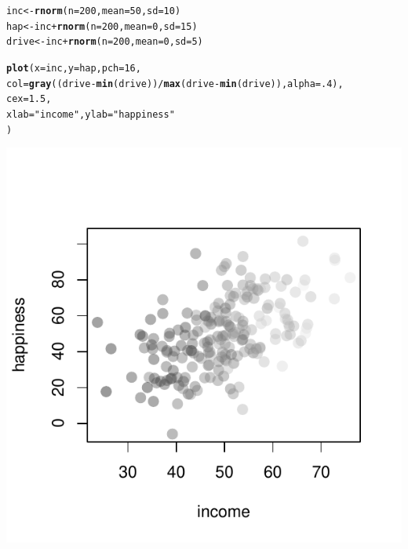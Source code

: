 \documentclass{tufte-book}\usepackage[]{graphicx}\usepackage[]{color}
\makeatletter
\def\maxwidth{ %
  \ifdim\Gin@nat@width>\linewidth
    \linewidth
  \else
    \Gin@nat@width
  \fi
}
\newcommand{\hlnum}[1]{\textcolor[rgb]{0.686,0.059,0.569}{#1}}%
\newcommand{\hlstr}[1]{\textcolor[rgb]{0.192,0.494,0.8}{#1}}%
\newcommand{\hlopt}[1]{\textcolor[rgb]{0,0,0}{#1}}%
\newcommand{\hlstd}[1]{\textcolor[rgb]{0.345,0.345,0.345}{#1}}%
\newcommand{\hlkwb}[1]{\textcolor[rgb]{0.69,0.353,0.396}{#1}}%
\newcommand{\hlkwc}[1]{\textcolor[rgb]{0.333,0.667,0.333}{#1}}%
\newcommand{\hlkwd}[1]{\textcolor[rgb]{0.737,0.353,0.396}{\textbf{#1}}}%
\newenvironment{kframe}{%
 \def\at@end@of@kframe{}%
 \ifinner\ifhmode%
  \def\at@end@of@kframe{\end{minipage}}%
  \begin{minipage}{\columnwidth}%
 \fi\fi%
 \def\FrameCommand##1{\hskip\@totalleftmargin \hskip-\fboxsep
 \colorbox{shadecolor}{##1}\hskip-\fboxsep
     \hskip-\linewidth \hskip-\@totalleftmargin \hskip\columnwidth}%
 \MakeFramed {\advance\hsize-\width
   \@totalleftmargin\z@ \linewidth\hsize
   \@setminipage}}%
 {\par\unskip\endMakeFramed%
 \at@end@of@kframe}
\newenvironment{knitrout}{}{} %
\makeatother
\begin{document}
\begin{footnotesize}
\begin{marginfigure}

\begin{tiny}
\begin{knitrout}
\color{fgcolor}\begin{kframe}
\begin{alltt}
\hlstd{inc} \hlkwb{<-} \hlkwd{rnorm}\hlstd{(}\hlkwc{n} \hlstd{=} \hlnum{200}\hlstd{,} \hlkwc{mean} \hlstd{=} \hlnum{50}\hlstd{,} \hlkwc{sd} \hlstd{=} \hlnum{10}\hlstd{)}
\hlstd{hap} \hlkwb{<-} \hlstd{inc} \hlopt{+} \hlkwd{rnorm}\hlstd{(}\hlkwc{n} \hlstd{=} \hlnum{200}\hlstd{,} \hlkwc{mean} \hlstd{=} \hlnum{0}\hlstd{,} \hlkwc{sd} \hlstd{=} \hlnum{15}\hlstd{)}
\hlstd{drive} \hlkwb{<-} \hlstd{inc} \hlopt{+} \hlkwd{rnorm}\hlstd{(}\hlkwc{n} \hlstd{=} \hlnum{200}\hlstd{,} \hlkwc{mean} \hlstd{=} \hlnum{0}\hlstd{,} \hlkwc{sd} \hlstd{=} \hlnum{5}\hlstd{)}

\hlkwd{plot}\hlstd{(}\hlkwc{x} \hlstd{= inc,} \hlkwc{y} \hlstd{= hap,} \hlkwc{pch} \hlstd{=} \hlnum{16}\hlstd{,}
     \hlkwc{col} \hlstd{=} \hlkwd{gray}\hlstd{((drive} \hlopt{-} \hlkwd{min}\hlstd{(drive))} \hlopt{/} \hlkwd{max}\hlstd{(drive} \hlopt{-} \hlkwd{min}\hlstd{(drive)),} \hlkwc{alpha} \hlstd{=} \hlnum{.4}\hlstd{),}
     \hlkwc{cex} \hlstd{=} \hlnum{1.5}\hlstd{,}
     \hlkwc{xlab} \hlstd{=} \hlstr{"income"}\hlstd{,} \hlkwc{ylab} \hlstd{=} \hlstr{"happiness"}
     \hlstd{)}
\end{alltt}
\end{kframe}
\includegraphics[width=\maxwidth]{figure/unnamed-chunk-172-1} 


\end{knitrout}
\end{tiny}
\end{marginfigure}
\end{footnotesize}
\end{document}
